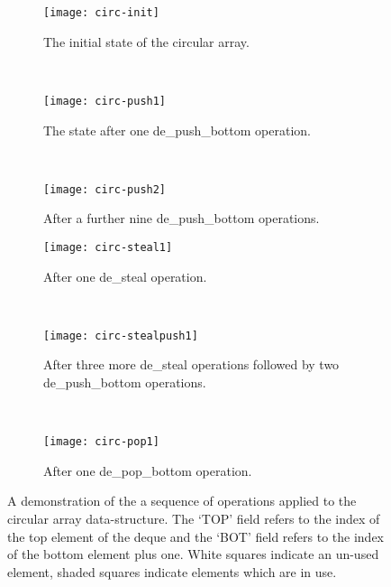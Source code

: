 
\begin{figure}[t]
\centering

\begin{subfigure}[b]{0.31\textwidth}
  \centering    
  \texttt{[image: circ-init]}
  \caption{
     \tiny The initial state of the circular array.
  }
  \label{fig:circ-1}
\end{subfigure}
~ %
\begin{subfigure}[b]{0.31\textwidth}
  \centering
  \texttt{[image: circ-push1]}
  \vspace{1pt}
  \caption{
     \tiny The state after one de\_push\_bottom operation.
  }
  \label{fig:circ-2}
\end{subfigure}
~ %
\begin{subfigure}[b]{0.31\textwidth}
  \centering
  \texttt{[image: circ-push2]}
  \caption{
    \tiny After a further nine de\_push\_bottom operations. 
  }
  \label{fig:circ-3}
\end{subfigure}

\vspace{10pt}

\begin{subfigure}[b]{0.31\textwidth}
  \centering
  \texttt{[image: circ-steal1]}
  \caption{
    \tiny After one de\_steal operation.
  }
  \label{fig:circ-4}
\end{subfigure}
~ %
\begin{subfigure}[b]{0.31\textwidth}
  \centering
  \texttt{[image: circ-stealpush1]}
  \caption{
    \tiny After three more de\_steal operations followed by two de\_push\_bottom
          operations.
  }
  \label{fig:circ-5}
\end{subfigure}
~ %
\begin{subfigure}[b]{0.31\textwidth}
  \centering
  \texttt{[image: circ-pop1]}
  \caption{
    \tiny After one de\_pop\_bottom operation.
  }
  \label{fig:circ-6}
\end{subfigure}

\caption{
    A demonstration of the a sequence of operations applied to the circular array
    data-structure.
    The `TOP' field refers to the index of the top element of the deque and
    the `BOT' field refers to the index of the bottom element plus one.
    White squares indicate an un-used element, shaded squares indicate
    elements which are in use.
}
\label{fig:circ-demo}
\end{figure}

